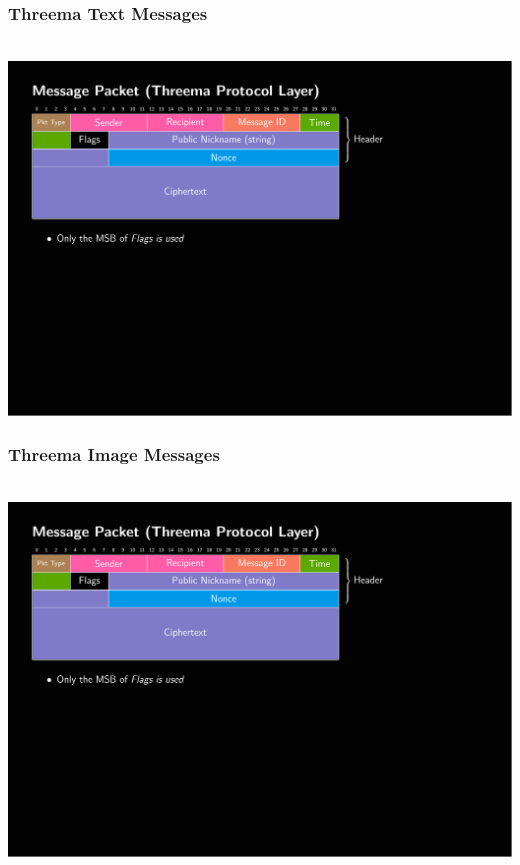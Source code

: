 \documentclass[
	aspectratio=169,
	xetex,
]{beamer}
\newcounter{i}
\begin{document}
\begin{frame}[t]
	\frametitle{Threema Text Messages}
	\-\\[1em]
	\includegraphics[page=3,clip,trim={.99cm 7.5cm 3.2cm 1.8cm},width=\textwidth]{out/messages.pdf}
\end{frame}

\begin{frame}[t]
	\frametitle{Threema Image Messages}
	\-\\[1em]
	\includegraphics[page=4,clip,trim={.99cm 7.5cm 3.2cm 1.8cm},width=\textwidth]{out/messages.pdf}
\end{frame}
\end{document}
